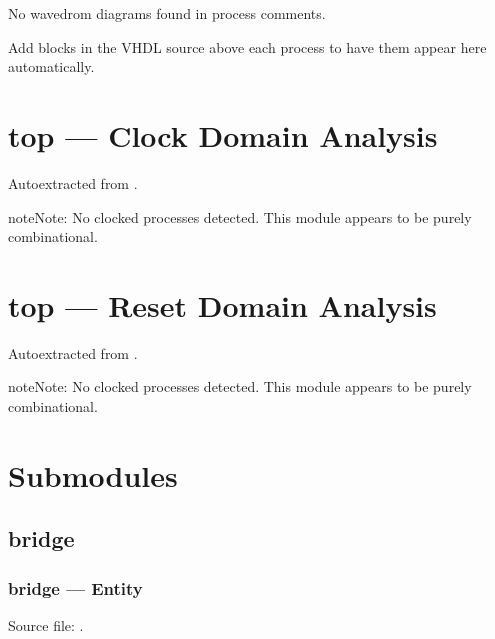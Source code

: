 \documentclass[letterpaper,10pt,english]{sphinxmanual}
\begin{document}
\sphinxAtStartPar
No wavedrom diagrams found in process comments.

\sphinxAtStartPar
Add  blocks in the VHDL source above each
process to have them appear here automatically.

\sphinxstepscope


\section{top — Clock Domain Analysis}
\label{\detokenize{modules/top/cdc:top-clock-domain-analysis}}\label{\detokenize{modules/top/cdc::doc}}
\sphinxAtStartPar
Auto\sphinxhyphen{}extracted from .

\begin{sphinxadmonition}{note}{Note:}
\sphinxAtStartPar
No clocked processes detected. This module appears to be purely combinational.
\end{sphinxadmonition}

\sphinxstepscope


\section{top — Reset Domain Analysis}
\label{\detokenize{modules/top/reset:top-reset-domain-analysis}}\label{\detokenize{modules/top/reset::doc}}
\sphinxAtStartPar
Auto\sphinxhyphen{}extracted from .

\begin{sphinxadmonition}{note}{Note:}
\sphinxAtStartPar
No clocked processes detected. This module appears to be purely combinational.
\end{sphinxadmonition}


\section{Submodules}
\label{\detokenize{modules/top/index:submodules}}
\sphinxstepscope


\subsection{bridge}
\label{\detokenize{modules/bridge/index:bridge}}\label{\detokenize{modules/bridge/index::doc}}
\sphinxstepscope


\subsubsection{bridge — Entity}
\label{\detokenize{modules/bridge/entity:bridge-entity}}\label{\detokenize{modules/bridge/entity::doc}}
\sphinxAtStartPar
Source file: .
\end{document}
